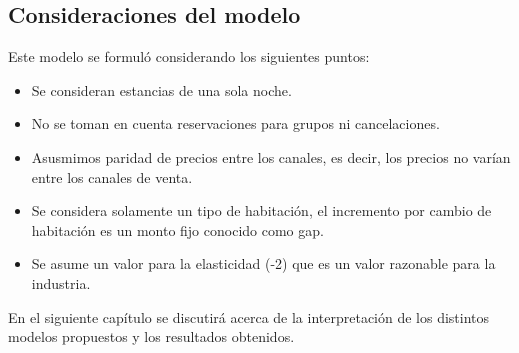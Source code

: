 \subsection*{Consideraciones del modelo}

Este modelo se formuló considerando los siguientes puntos:
\begin{itemize}[noitemsep]
  \item Se consideran estancias de una sola noche.
  \item No se toman en cuenta reservaciones para grupos ni cancelaciones.
  \item Asusmimos paridad de precios entre los canales, es decir, los precios no varían entre los canales de venta.
  \item Se considera solamente un tipo de habitación, el incremento por cambio de habitación es un monto fijo conocido como gap.
  \item Se asume un valor para la elasticidad (-2) que es un valor razonable para la industria.
\end{itemize}

En el siguiente capítulo se discutirá acerca de la interpretación de los distintos modelos propuestos y los resultados obtenidos.
